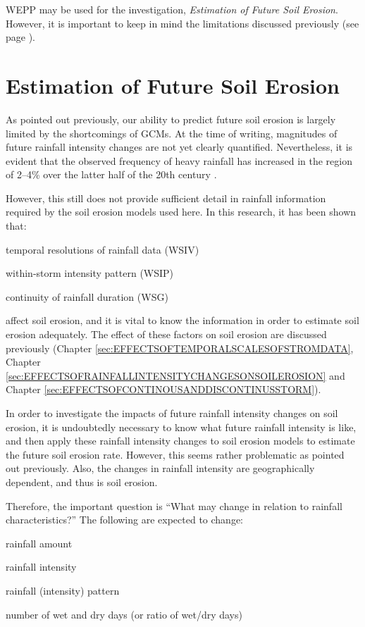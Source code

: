 WEPP may be used for the investigation, \textit{Estimation of Future Soil
Erosion}. However, it is important to keep in mind the limitations discussed
previously (see page \pageref{sec:WEPPModificationofBP}).


\section{Estimation of Future Soil Erosion}
\label{sec:MethodsEstimatedFutureSoilErosion}

As pointed out previously, our ability to predict future soil erosion is largely
limited by the shortcomings of GCMs. At the time of writing, magnitudes of
future rainfall intensity changes are not yet clearly quantified. Nevertheless,
it is evident that the observed frequency of heavy rainfall has increased in the
region of 2--4\% over the latter half of the 20th century
\citep{ipcc2001-881}.

However, this still does not provide sufficient detail in rainfall information
required by the soil erosion models used here. In this research, it has been
shown that:
\begin{itemize*}
\item temporal resolutions of rainfall data (WSIV)
\item within-storm intensity pattern (WSIP)
\item continuity of rainfall duration (WSG)
\end{itemize*}
affect soil erosion, and it is vital to know the information in order to
estimate soil erosion adequately. The effect of these factors on soil erosion
are discussed previously (Chapter \ref{sec:EFFECTSOFTEMPORALSCALESOFSTROMDATA},
Chapter \ref{sec:EFFECTSOFRAINFALLINTENSITYCHANGESONSOILEROSION} and Chapter
\ref{sec:EFFECTSOFCONTINOUSANDDISCONTINUSSTORM}).

In order to investigate the impacts of future rainfall intensity changes on soil
erosion, it is undoubtedly necessary to know what future rainfall intensity is
like, and then apply these rainfall intensity changes to soil erosion models to
estimate the future soil erosion rate. However, this seems rather problematic as
pointed out previously. Also, the changes in rainfall intensity are
geographically dependent, and thus is soil erosion.

Therefore, the important question is ``What may change in relation to rainfall
characteristics?'' The following are expected to change:
\begin{itemize*}
  \item rainfall amount
  \item rainfall intensity
  \item rainfall (intensity) pattern
  \item number of wet and dry days (or ratio of wet/dry days)
\end{itemize*}

